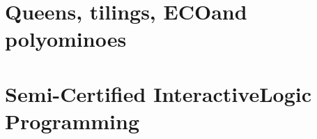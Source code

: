 \documentclass[a4paper,10pt]{tufte-book}
\begin{document}


\chapter{Queens, tilings, ECO\newline and polyominoes}
\label{ch:queens-tilings-polyominoes}



\chapter{Semi-Certified Interactive\newline Logic Programming}
\label{ch:scilp}



\iffalse
\chapter*{Conclusions}

\fi



\end{document}
